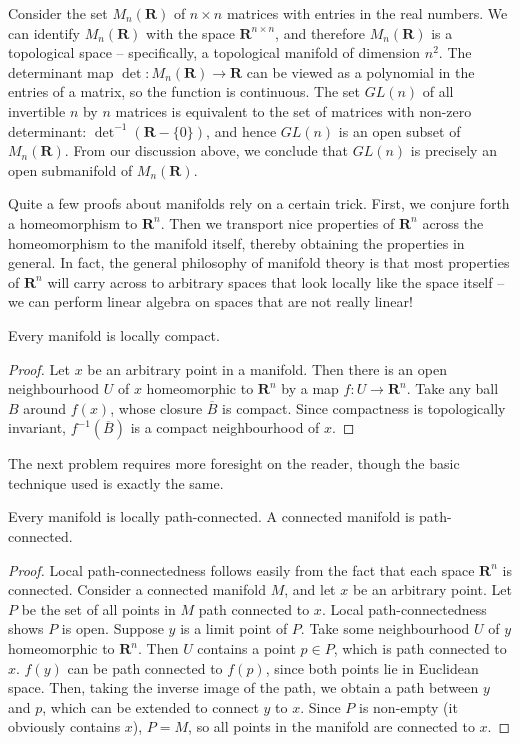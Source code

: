 \begin{example}
    Consider the set $M_n(\mathbf{R})$ of $n \times n$ matrices with entries in the real numbers. We can identify $M_n(\mathbf{R})$ with the space $\mathbf{R}^{n \times n}$, and therefore $M_n(\mathbf{R})$ is a topological space -- specifically, a topological manifold of dimension $n^2$. The determinant map $\det:M_n(\mathbf{R}) \to \mathbf{R}$ can be viewed as a polynomial in the entries of a matrix, so the function is continuous. The set $GL(n)$ of all invertible $n$ by $n$ matrices is equivalent to the set of matrices with non-zero determinant: $\det^{-1}(\mathbf{R} - \{0\})$, and hence $GL(n)$ is an open subset of $M_n(\mathbf{R})$. From our discussion above, we conclude that $GL(n)$ is precisely an open submanifold of $M_n(\mathbf{R})$.
\end{example}

Quite a few proofs about manifolds rely on a certain trick. First, we conjure forth a homeomorphism to $\mathbf{R}^n$. Then we transport nice properties of $\mathbf{R}^n$ across the homeomorphism to the manifold itself, thereby obtaining the properties in general. In fact, the general philosophy of manifold theory is that most properties of $\mathbf{R}^n$ will carry across to arbitrary spaces that look locally like the space itself -- we can perform linear algebra on spaces that are not really linear!

\begin{theorem}
    Every manifold is locally compact.
\end{theorem}
\begin{proof}
    Let $x$ be an arbitrary point in a manifold. Then there is an open neighbourhood $U$ of $x$ homeomorphic to $\mathbf{R}^n$ by a map $f:U \to \mathbf{R}^n$. Take any ball $B$ around $f(x)$, whose closure $\overline{B}$ is compact. Since compactness is topologically invariant, $f^{-1}(\overline{B})$ is a compact neighbourhood of $x$.
\end{proof}

The next problem requires more foresight on the reader, though the basic technique used is exactly the same.

\begin{theorem}
    Every manifold is locally path-connected. A connected manifold is path-connected.
\end{theorem}
\begin{proof}
    Local path-connectedness follows easily from the fact that each space $\mathbf{R}^n$ is connected. Consider a connected manifold $M$, and let $x$ be an arbitrary point. Let $P$ be the set of all points in $M$ path connected to $x$. Local path-connectedness shows $P$ is open. Suppose $y$ is a limit point of $P$. Take some neighbourhood $U$ of $y$ homeomorphic to $\mathbf{R}^n$. Then $U$ contains a point $p \in P$, which is path connected to $x$. $f(y)$ can be path connected to $f(p)$, since both points lie in Euclidean space. Then, taking the inverse image of the path, we obtain a path between  $y$ and $p$, which can be extended to connect $y$ to $x$. Since $P$ is non-empty (it obviously contains $x$), $P = M$, so all points in the manifold are connected to $x$.
\end{proof}

